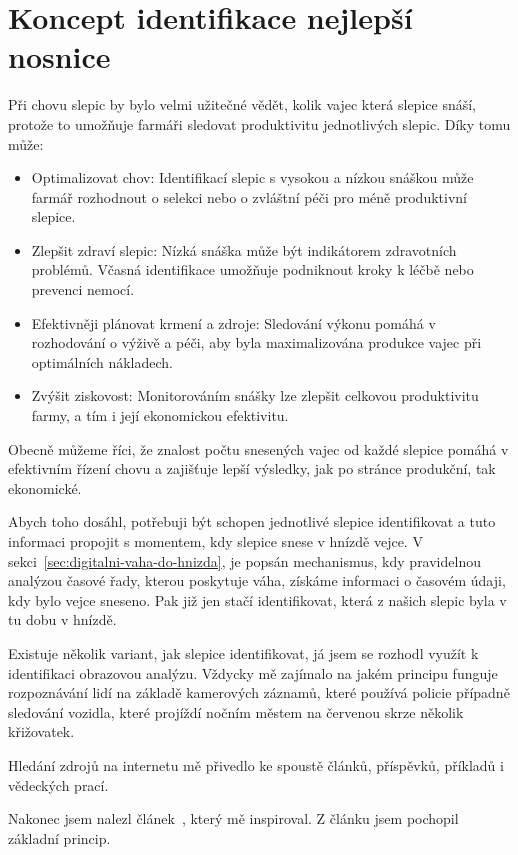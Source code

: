 \section{Koncept identifikace nejlepší nosnice}\label{sec:koncept-identifikace-nejlepsi-nosnice}
Při chovu slepic by bylo velmi užitečné vědět, kolik vajec která slepice snáší, protože to umožňuje farmáři sledovat produktivitu jednotlivých slepic.
Díky tomu může:
\begin{itemize}
    \item Optimalizovat chov: Identifikací slepic s vysokou a nízkou snáškou může farmář rozhodnout o selekci nebo o zvláštní péči pro méně produktivní slepice.
    \item Zlepšit zdraví slepic: Nízká snáška může být indikátorem zdravotních problémů.
    Včasná identifikace umožňuje podniknout kroky k léčbě nebo prevenci nemocí.
    \item Efektivněji plánovat krmení a zdroje: Sledování výkonu pomáhá v rozhodování o výživě a péči, aby byla maximalizována produkce vajec při optimálních nákladech.
    \item Zvýšit ziskovost: Monitorováním snášky lze zlepšit celkovou produktivitu farmy, a tím i její ekonomickou efektivitu.
\end{itemize}

Obecně můžeme říci, že znalost počtu snesených vajec od každé slepice pomáhá v efektivním řízení chovu a zajišťuje lepší výsledky, jak po stránce produkční, tak ekonomické.

Abych toho dosáhl, potřebuji být schopen jednotlivé slepice identifikovat a tuto informaci propojit s momentem, kdy slepice snese v hnízdě vejce.
V sekci~\ref{sec:digitalni-vaha-do-hnizda}, je popsán mechanismus, kdy pravidelnou analýzou časové řady, kterou poskytuje váha, získáme informaci o časovém údaji, kdy bylo vejce sneseno.
Pak již jen stačí identifikovat, která z našich slepic byla v tu dobu v hnízdě.

Existuje několik variant, jak slepice identifikovat, já jsem se rozhodl využít k identifikaci obrazovou analýzu.
Vždycky mě zajímalo na jakém principu funguje rozpoznávání lidí na základě kamerových záznamů, které používá policie případně sledování vozidla, které projíždí nočním městem na červenou skrze několik křižovatek.

Hledání zdrojů na internetu mě přivedlo ke spoustě článků, příspěvků, příkladů i vědeckých prací.

Nakonec jsem nalezl článek~\cite{medium-person-reidentification}, který mě inspiroval.
Z článku jsem pochopil základní princip.\newline

